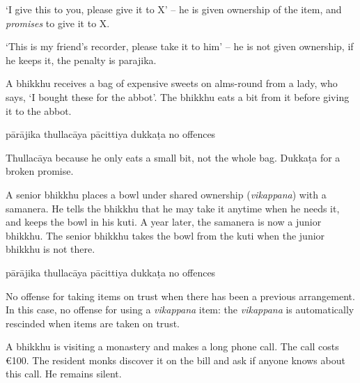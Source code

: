 \begin{exam}{\autoExamName}
\begin{problem*}
\begin{parts}
\begin{solution}
    `I give this to you, please give it to X' -- he is given ownership of the
    item, and \emph{promises} to give it to X.

    `This is my friend's recorder, please take it to him' -- he is not given
    ownership, if he keeps it, the penalty is parajika.
  \end{solution}

  \bigskip

  \item A bhikkhu receives a bag of expensive sweets on alms-round from a lady, who
  says, `I bought these for the abbot'. The bhikkhu eats a bit from it before giving it
  to the abbot.

  \bigskip

  \begin{answers}{5}
    \bChoices
     pārājika\eAns
     thullacāya\eAns
     pācittiya\eAns
     dukkaṭa\eAns
     no offences\eAns
    \eChoices
  \end{answers}

  \begin{solution}
    Thullacāya because he only eats a small bit, not the whole bag. Dukkaṭa for a broken promise.
  \end{solution}

  \bigskip

  \item A senior bhikkhu places a bowl under shared ownership (\emph{vikappana}) with a samanera.
  He tells the bhikkhu that he may take it anytime when he needs it, and keeps the bowl in his kuti.
  A year later, the samanera is now a junior bhikkhu.
  The senior bhikkhu takes the bowl from the kuti when the junior bhikkhu is not there.

  \bigskip

  \begin{answers}{5}
    \bChoices
     pārājika\eAns
     thullacāya\eAns
     pācittiya\eAns
     dukkaṭa\eAns
     no offences\eAns
    \eChoices
  \end{answers}

  \begin{solution}
    No offense for taking items on trust when there has been a previous
    arrangement. In this case, no offense for using a \textit{vikappana} item:
    the \emph{vikappana} is automatically rescinded when items are taken on
    trust.
  \end{solution}

  \item A bhikkhu is visiting a monastery and makes a long phone call. The call
  costs €100. The resident monks discover it on the bill and ask if
  anyone knows about this call. He remains silent.


\end{parts}
\end{problem*}
\end{exam}
